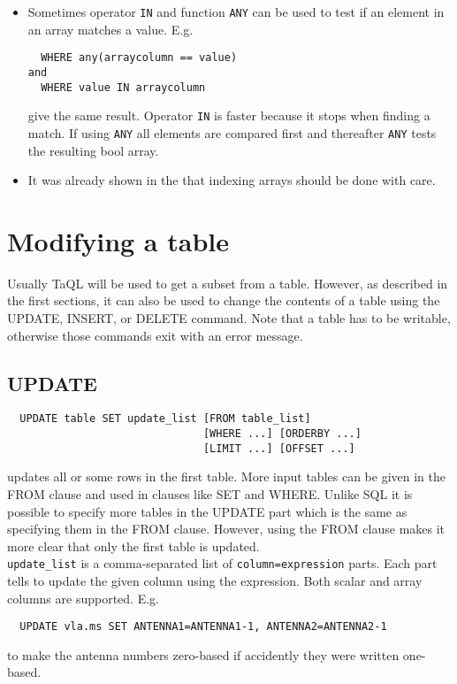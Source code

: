 \begin{itemize}
\item
Sometimes operator \texttt{IN} and function \texttt{ANY} can be used to test
if an element in an array matches a value. E.g.
\begin{verbatim}
  WHERE any(arraycolumn == value)
and
  WHERE value IN arraycolumn
\end{verbatim}
give the same result.
Operator \texttt{IN} is faster because it stops when finding a
match. If using \texttt{ANY} all elements are compared first and thereafter
\texttt{ANY} tests the resulting bool array.

\item
It was already shown in the
that indexing arrays should be done with care.
\end{itemize}


\section{\label{TAQL:MODIFYING}Modifying a table}
Usually TaQL will be used to get a subset from a table. However, as
described in the first sections, it can also be used to change the
contents of a table using the UPDATE, INSERT, or DELETE command.
Note that a table has to be writable, otherwise those commands
exit with an error message.

\subsection{UPDATE}
\begin{verbatim}
  UPDATE table SET update_list [FROM table_list]
                               [WHERE ...] [ORDERBY ...]
                               [LIMIT ...] [OFFSET ...]
\end{verbatim}
updates all or some rows in the first table. More input
tables can be given in the FROM clause and used in clauses like SET and
WHERE. Unlike SQL it is possible to specify more tables in the
UPDATE part which is the same as specifying them in the FROM
clause. However, using the FROM clause makes it more clear that only
the first table is updated.
\\\texttt{update\_list}
is a comma-separated list of \texttt{column=expression} parts.
Each part tells to update the given column using the
expression. Both scalar and array columns are supported.
E.g.
\begin{verbatim}
  UPDATE vla.ms SET ANTENNA1=ANTENNA1-1, ANTENNA2=ANTENNA2-1
\end{verbatim}
to make the antenna numbers zero-based if accidently they were
written one-based.

